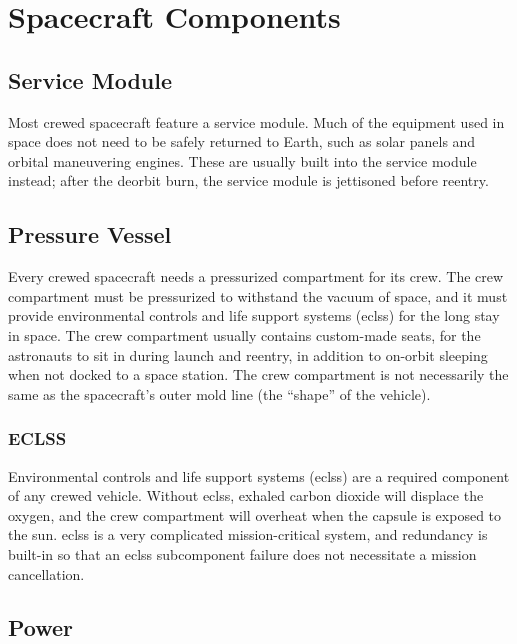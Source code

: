 
\chapter{Spacecraft Components}

\section{Service Module}

Most crewed spacecraft feature a service module. Much of the equipment
used in space does not need to be safely returned to Earth, such as
solar panels and orbital maneuvering engines. These are usually built
into the service module instead; after the deorbit burn, the service
module is jettisoned before reentry.


\section{Pressure Vessel}

Every crewed spacecraft needs a pressurized compartment for its
crew. The crew compartment must be pressurized to withstand the vacuum
of space, and it must provide environmental controls and life support
systems (\acrshort{eclss}) for the long stay in space. The crew
compartment usually contains custom-made seats, for the astronauts to
sit in during launch and reentry, in addition to on-orbit sleeping
when not docked to a space station. The crew compartment is not
necessarily the same as the spacecraft's outer mold line (the
``shape'' of the vehicle).


\subsection{ECLSS}

Environmental controls and life support systems (\acrshort{eclss}) are
a required component of any crewed vehicle. Without \acrshort{eclss},
exhaled carbon dioxide will displace the oxygen, and the crew
compartment will overheat when the capsule is exposed to the
sun. \acrshort{eclss} is a very complicated mission-critical system,
and redundancy is built-in so that an \acrshort{eclss} subcomponent
failure does not necessitate a mission cancellation.

\section{Power}

